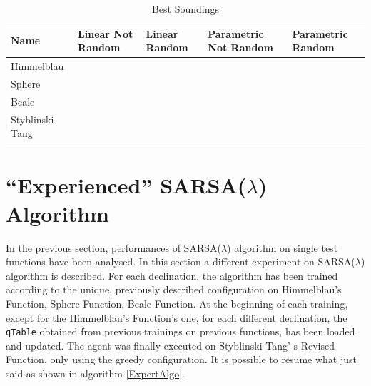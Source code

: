 \begin{table} 
	\centering
	\label{table:BestSoundings}
	\caption{Best Soundings}
	\begin{tabular}
		{l l l l l} \hline Name & Linear Not Random & Linear Random & Parametric Not Random & Parametric Random \\
		\hline Himmelblau & \vtop{\hbox{\strut $2486.938$}\hbox{\strut $(2.67, 1.34)$}\hbox{\strut}\hbox{\strut}} &\cellcolor{blue!25} \vtop{\hbox{\strut $2498.457$}\hbox{\strut $(3.67, -1.57)$}\hbox{\strut}\hbox{\strut}} & \vtop{\hbox{\strut $2485.972$}\hbox{\strut $(-2.1, 3.30)$}\hbox{\strut}\hbox{\strut}} & \vtop{\hbox{\strut $2492.11$}\hbox{\strut $(-2.283, 3.234)$}\hbox{\strut}\hbox{\strut}} \\
		Sphere & \vtop{\hbox{\strut $3484.44$}\hbox{\strut $(-8.8, -0.67)$}\hbox{\strut}\hbox{\strut}} & \vtop{\hbox{\strut $3537.986$}\hbox{\strut $(-3.24, 3.40)$}\hbox{\strut}\hbox{\strut}} &\cellcolor{blue!25} \vtop{\hbox{\strut $3557.722$}\hbox{\strut $(-1.034, -1.099)$}\hbox{\strut}\hbox{\strut}} & \vtop{\hbox{\strut $3553.626$}\hbox{\strut $(1.69, 1.88)$}\hbox{\strut}\hbox{\strut}} \\
		Beale & \vtop{\hbox{\strut $1985.797$}\hbox{\strut $(0, 0)$}\hbox{\strut}\hbox{\strut}} & \vtop{\hbox{\strut $1472.184$}\hbox{\strut $(1.69, 2.269)$}\hbox{\strut}\hbox{\strut}} &\cellcolor{blue!25} \vtop{\hbox{\strut $1997.392$}\hbox{\strut $(-0.77, 1.559)$}\hbox{\strut}\hbox{\strut}} & \vtop{\hbox{\strut $1994.983$}\hbox{\strut $(1.309, -0.89)$}\hbox{\strut}\hbox{\strut}} \\
		Styblinski-Tang & \vtop{\hbox{\strut $5153.086$}\hbox{\strut $(-2.67, -2.67)$}\hbox{\strut}\hbox{\strut}} & \vtop{\hbox{\strut $5126.192$}\hbox{\strut $(3, -2.97)$}\hbox{\strut}\hbox{\strut}} &\cellcolor{blue!25} \vtop{\hbox{\strut $5155.97$}\hbox{\strut $(-2.77, -2.95)$}\hbox{\strut}\hbox{\strut}} & \vtop{\hbox{\strut $5154.053$}\hbox{\strut $(-3.17, -2.99)$}\hbox{\strut}\hbox{\strut}} \\
		\hline
	\end{tabular}
\end{table}

\section{ \enquote{Experienced} SARSA($\lambda$) Algorithm}

In the previous section, performances of SARSA($\lambda$) algorithm on single test functions have been analysed. In this section a different experiment on SARSA($\lambda$) algorithm is described. For each declination, the algorithm has been trained according to the unique, previously described configuration on Himmelblau's Function, Sphere Function, Beale Function. At the beginning of each training, except for the Himmelblau's Function's one, for each different declination, the {\tt qTable} obtained from previous trainings on previous functions, has been loaded and updated. The agent was finally executed on Styblinski-Tang' s Revised Function, only using the greedy configuration. It is possible to resume what just said as shown in algorithm \ref{ExpertAlgo}.

